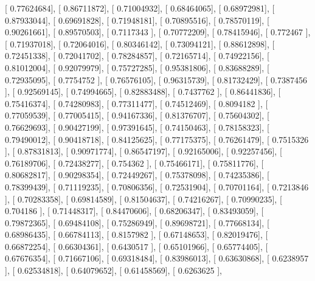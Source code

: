 \documentclass{article}
\begin{document}
       [ 0.77624684],
       [ 0.86711872],
       [ 0.71004932],
       [ 0.68464065],
       [ 0.68972981],
       [ 0.87933044],
       [ 0.69691828],
       [ 0.71948181],
       [ 0.70895516],
       [ 0.78570119],
       [ 0.90261661],
       [ 0.89570503],
       [ 0.7117343 ],
       [ 0.70772209],
       [ 0.78415946],
       [ 0.772467  ],
       [ 0.71937018],
       [ 0.72064016],
       [ 0.80346142],
       [ 0.73094121],
       [ 0.88612898],
       [ 0.72451338],
       [ 0.72041702],
       [ 0.78284857],
       [ 0.72165714],
       [ 0.74922156],
       [ 0.81012004],
       [ 0.92079979],
       [ 0.75727285],
       [ 0.95381806],
       [ 0.83688289],
       [ 0.72935095],
       [ 0.7754752 ],
       [ 0.76576105],
       [ 0.96315739],
       [ 0.81732429],
       [ 0.7387456 ],
       [ 0.92569145],
       [ 0.74994665],
       [ 0.82883488],
       [ 0.7437762 ],
       [ 0.86441836],
       [ 0.75416374],
       [ 0.74280983],
       [ 0.77311477],
       [ 0.74512469],
       [ 0.8094182 ],
       [ 0.77059539],
       [ 0.77005415],
       [ 0.94167336],
       [ 0.81376707],
       [ 0.75604302],
       [ 0.76629693],
       [ 0.90427199],
       [ 0.97391645],
       [ 0.74150463],
       [ 0.78158323],
       [ 0.79490012],
       [ 0.90418718],
       [ 0.84125625],
       [ 0.77175375],
       [ 0.76261479],
       [ 0.7515326 ],
       [ 0.87831813],
       [ 0.90971774],
       [ 0.86547197],
       [ 0.92165006],
       [ 0.92257456],
       [ 0.76189706],
       [ 0.72438277],
       [ 0.754362  ],
       [ 0.75466171],
       [ 0.75811776],
       [ 0.80682817],
       [ 0.90298354],
       [ 0.72449267],
       [ 0.75378098],
       [ 0.74235386],
       [ 0.78399439],
       [ 0.71119235],
       [ 0.70806356],
       [ 0.72531904],
       [ 0.70701164],
       [ 0.7213846 ],
       [ 0.70283358],
       [ 0.69814589],
       [ 0.81504637],
       [ 0.74216267],
       [ 0.70990235],
       [ 0.704186  ],
       [ 0.71448317],
       [ 0.84470606],
       [ 0.68206347],
       [ 0.83493059],
       [ 0.79872365],
       [ 0.69484108],
       [ 0.75286949],
       [ 0.89698721],
       [ 0.77668134],
       [ 0.68986435],
       [ 0.66784113],
       [ 0.8157982 ],
       [ 0.67148653],
       [ 0.82019476],
       [ 0.66872254],
       [ 0.66304361],
       [ 0.6430517 ],
       [ 0.65101966],
       [ 0.65774405],
       [ 0.67676354],
       [ 0.71667106],
       [ 0.69318484],
       [ 0.83986013],
       [ 0.63630868],
       [ 0.6238957 ],
       [ 0.62534818],
       [ 0.64079652],
       [ 0.61458569],
       [ 0.6263625 ],
\end{document}
